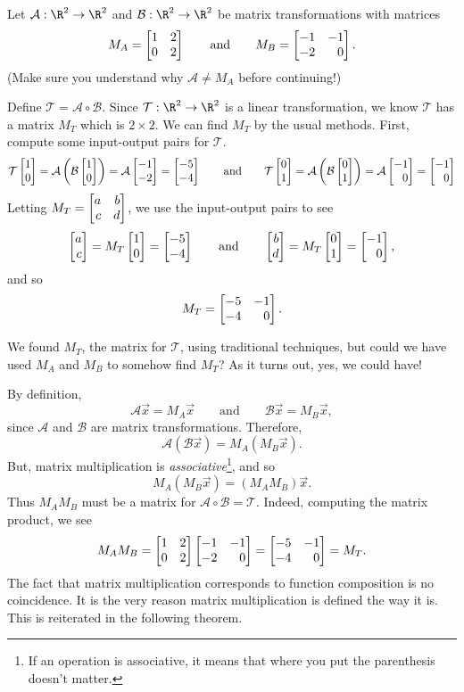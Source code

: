 Let $\mathcal A:\R^2\to\R^2$ and $\mathcal B:\R^2\to\R^2$ be matrix transformations with matrices
\[
	M_A=\mat{1&2\\0&2}\qquad\text{and}\qquad M_B=\mat{-1&-1\\-2&0}.
\]
(Make sure you understand why $\mathcal A\neq M_A$ before continuing!)


Define $\mathcal T=\mathcal A\circ \mathcal B$. Since $\mathcal T:\R^2\to\R^2$ is a linear transformation, 
we know $\mathcal T$ has a matrix $M_T$ which is $2\times 2$. We can
find $M_T$ by the usual methods. First, compute some input-output pairs for $\mathcal T$.
\[
	\mathcal T\mat{1\\0} = \mathcal A\left( \mathcal B\mat{1\\0}\right) = \mathcal A\mat{-1\\-2}=\mat{-5\\-4}
	\qquad\text{and}\qquad
	\mathcal T\mat{0\\1} = \mathcal A\left( \mathcal B\mat{0\\1}\right) = \mathcal A\mat{-1\\0}=\mat{-1\\0}
\]
Letting $M_T=\mat{a&b\\c&d}$, we use the input-output pairs to see
\[
	\mat{a\\c}=M_T\mat{1\\0}=\mat{-5\\-4}\qquad \text{and}\qquad \mat{b\\d}=M_T\mat{0\\1}=\mat{-1\\0},
\]
and so
\[
	M_T=\mat{-5&-1\\-4&0}.
\]

We found $M_T$, the matrix for $\mathcal T$, using traditional techniques, but could we have used $M_A$ and $M_B$ to somehow find $M_T$?
As it turns out, yes, we could have!

By definition,
\[
	\mathcal A\vec x=M_A\vec x\qquad\text{and}\qquad \mathcal B\vec x=M_B\vec x,
\]
since $\mathcal A$ and $\mathcal B$ are matrix transformations. Therefore,
\[
	\mathcal A(\mathcal B\vec x) = M_A(M_B\vec x).
\]
But, matrix multiplication is \emph{associative}\footnote{ If an operation is associative, it means
that where you put the parenthesis doesn't matter.}, and so
\[
	M_A(M_B\vec x)=(M_AM_B)\vec x.
\]
Thus $M_AM_B$ must be a matrix for $\mathcal A\circ \mathcal B=\mathcal T$. Indeed, computing the matrix product, we see
\[
	M_AM_B=\mat{1&2\\0&2}\mat{-1&-1\\-2&0}=\mat{-5&-1\\-4&0}=M_T.
\]
The fact that matrix multiplication corresponds to function composition is no coincidence. It is the very
reason matrix multiplication is defined the way it is. This is reiterated in the following theorem.

